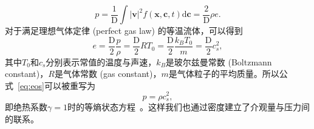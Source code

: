 \begin{equation}
    p=\frac{1}{\mathrm{D}} \int|\boldsymbol{v}|^2 f(\boldsymbol{x}, \mathbf{c}, t) \mathrm{d} \mathbf{c}=\frac{2}{\mathrm{D}} \rho e.
    \label{eq:eos}
\end{equation}
对于满足理想气体定律 (perfect gas law) 的等温流体，可以得到
\begin{equation}
    e=\frac{\mathrm{D}}{2} \frac{p}{\rho}=\frac{\mathrm{D}}{2} R T_0=\frac{\mathrm{D}}{2} \frac{k_B T_0}{m}=\frac{\mathrm{D}}{2} c_s^2,
\end{equation}
其中$T_0$和$c_s$分别表示常值的温度与声速，$k_B$是玻尔兹曼常数 (Boltzmann constant)，$R$是气体常数 (gas constant)，$m$是气体粒子的平均质量。所以公式~\ref{eq:eos}可以被重写为
\begin{equation}
    p=\rho c_s^2,
\end{equation}
即绝热系数$\gamma=1$时的等熵状态方程~\citep{kundu2015fluid}。这样我们也通过密度建立了介观量与压力间的联系。

